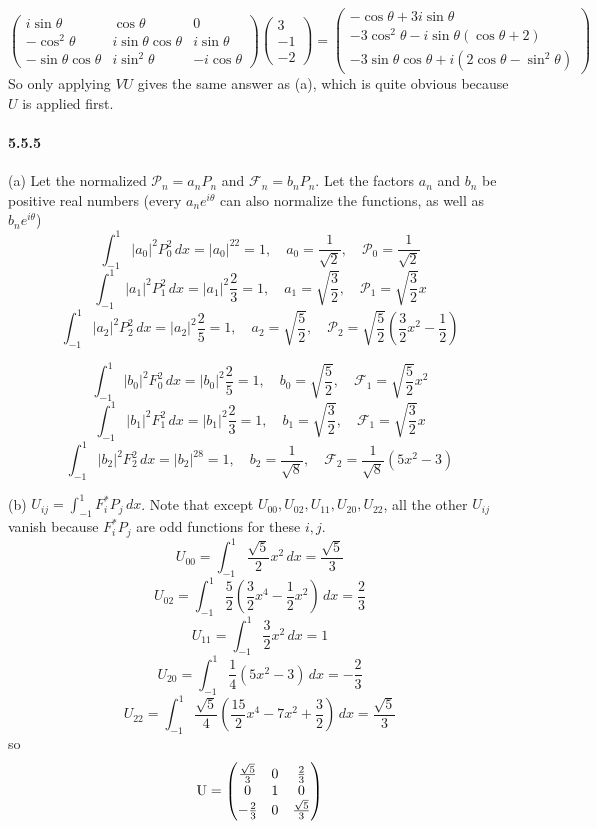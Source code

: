\documentclass[a4paper]{article}
\begin{document}
\[
\begin{pmatrix}
i\sin\theta&\cos\theta&0\\
-\cos^2\theta&i\sin\theta\cos\theta&i\sin\theta\\
-\sin\theta\cos\theta&i\sin^2\theta&-i\cos\theta
\end{pmatrix}
\begin{pmatrix}
3\\-1\\-2
\end{pmatrix}=
\begin{pmatrix}
-\cos\theta+3i\sin\theta\\
-3\cos^2\theta-i\sin\theta(\cos\theta+2)\\
-3\sin\theta\cos\theta+i(2\cos\theta-\sin^2\theta)
\end{pmatrix}
\]
So only applying $VU$ gives the same answer as (a), which is quite obvious because $U$ is applied first.

\paragraph{5.5.5}
\newcommand{\PP}[1]{\mathcal{P}_{#1}}
\newcommand{\FF}[1]{\mathcal{F}_{#1}}
\newcommand{\II}[1]{\int_{-1}^1#1\,dx}
(a) Let the normalized $\PP{n}=a_nP_n$ and $\FF{n}=b_nP_n$. Let the factors $a_n$ and $b_n$ be positive real numbers (every $a_ne^{i\theta}$ can also normalize the functions, as well as $b_ne^{i\theta}$)
\[
\II{|a_0|^2P_0^2}=|a_0|^22=1,\quad a_0=\frac{1}{\sqrt{2}},\quad\PP{0}=\frac{1}{\sqrt{2}}
\]
\[
\II{|a_1|^2P_1^2}=|a_1|^2\frac{2}{3}=1,\quad a_1=\sqrt{\frac{3}{2}},\quad\PP{1}=\sqrt{\frac{3}{2}}x
\]
\[
\II{|a_2|^2P_2^2}=|a_2|^2\frac{2}{5}=1,\quad a_2=\sqrt{\frac{5}{2}},\quad\PP{2}=\sqrt{\frac{5}{2}}(\frac{3}{2}x^2-\frac{1}{2})
\]

\[
\II{|b_0|^2F_0^2}=|b_0|^2\frac{2}{5}=1,\quad b_0=\sqrt{\frac{5}{2}},\quad\FF{1}=\sqrt{\frac{5}{2}}x^2
\]
\[
\II{|b_1|^2F_1^2}=|b_1|^2\frac{2}{3}=1,\quad b_1=\sqrt{\frac{3}{2}},\quad\FF{1}=\sqrt{\frac{3}{2}}x
\]
\[
\II{|b_2|^2F_2^2}=|b_2|^28=1,\quad b_2=\frac{1}{\sqrt{8}},\quad\FF{2}=\frac{1}{\sqrt{8}}(5x^2-3)
\]

(b) $U_{ij}=\II{F_i^*P_j}$. Note that except $U_{00},U_{02},U_{11},U_{20},U_{22}$, all the other $U_{ij}$ vanish because $F_i^*P_j$ are odd functions for these $i,j$.
\[
U_{00}=\II{\frac{\sqrt{5}}{2}x^2}=\frac{\sqrt{5}}{3}
\]
\[
U_{02}=\II{\frac{5}{2}(\frac{3}{2}x^4-\frac{1}{2}x^2)}=\frac{2}{3}
\]
\[
U_{11}=\II{\frac{3}{2}x^2}=1
\]
\[
U_{20}=\II{\frac{1}{4}(5x^2-3)}=-\frac{2}{3}
\]
\[
U_{22}=\II{\frac{\sqrt{5}}{4}(\frac{15}{2}x^4-7x^2+\frac{3}{2})}=\frac{\sqrt{5}}{3}
\]
so
\[
\mathrm{U}=
\begin{pmatrix}
\frac{\sqrt{5}}{3}&0&\frac{2}{3}\\
0&1&0\\
-\frac{2}{3}&0&\frac{\sqrt{5}}{3}
\end{pmatrix}
\]
\end{document}
